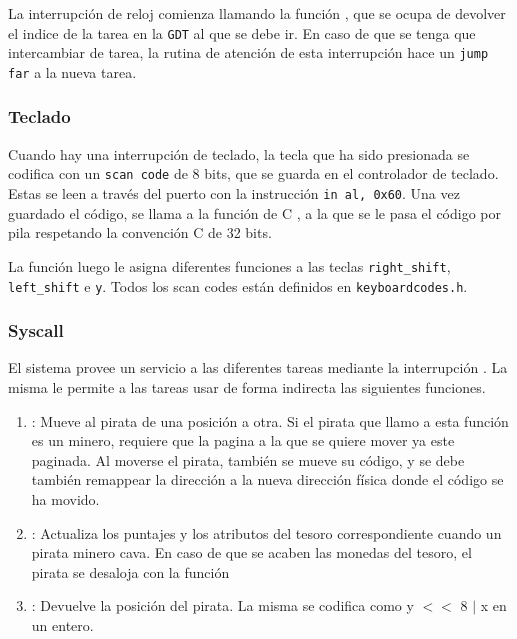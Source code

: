 La interrupción de reloj comienza llamando la función , que se ocupa de devolver el indice de la tarea en la \texttt{GDT} al que se debe ir. En caso de que se tenga que intercambiar de tarea, la rutina de atención de esta interrupción hace un \texttt{jump far} a la nueva tarea.

\subsubsection{Teclado}

Cuando hay una interrupción de teclado, la tecla que ha sido presionada se codifica con un \texttt{scan code} de 8 bits, que se guarda en el controlador de teclado. Estas se leen a través del puerto  con la instrucción \texttt{in al, 0x60}. Una vez guardado el código, se llama a la función de C , a la que se le pasa el código por pila respetando la convención C de 32 bits.

La función  luego le asigna diferentes funciones a las teclas \texttt{right\_shift}, \texttt{left\_shift} e \texttt{y}. Todos los scan codes están definidos en \texttt{keyboardcodes.h}.

\subsubsection{Syscall}
El sistema provee un servicio a las diferentes tareas mediante la interrupción . La misma le permite a las tareas usar de forma indirecta las siguientes funciones.
\begin{enumerate}
\item {}: Mueve al pirata de una posición a otra. Si el pirata que llamo a esta función es un minero, requiere que la pagina a la que  se quiere mover ya este paginada. Al moverse el pirata, también se mueve su código, y se debe también remappear la dirección  a la nueva dirección física donde el código se ha movido.
\item {}: Actualiza los puntajes y los atributos del tesoro correspondiente cuando un pirata minero cava. En caso de que se acaben las monedas del tesoro, el pirata se desaloja con la función 
\item {}: Devuelve la posición del pirata. La misma se codifica como y $<<$ 8 $|$ x en un entero.
\end{enumerate}

